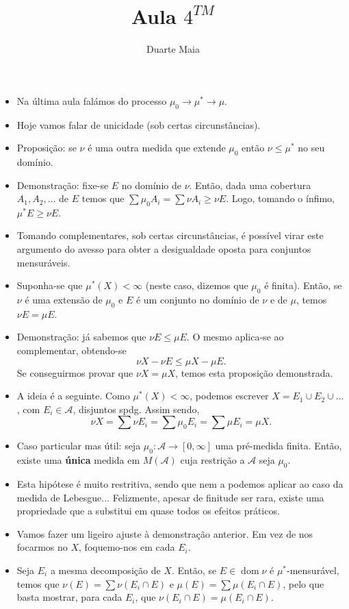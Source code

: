 \documentclass{article}
\title{Aula $4^{TM}$}
\author{Duarte Maia}
\date{}
\DeclareMathOperator{\dom}{dom}
\begin{document}
\maketitle

\begin{itemize}
\item Na última aula falámos do processo $\mu_0 \to \mu^* \to \mu$.
\item Hoje vamos falar de unicidade (sob certas circunstâncias).
\item Proposição: se $\nu$ é uma outra medida que extende $\mu_0$ então $\nu \leq \mu^*$ no seu domínio.
\item Demonstração: fixe-se $E$ no domínio de $\nu$. Então, dada uma cobertura $A_1, A_2, \dots$ de $E$ temos que $\sum \mu_0 A_i = \sum \nu A_i \geq \nu E$. Logo, tomando o ínfimo, $\mu^* E \geq \nu E$.
\item Tomando complementares, sob certas circunstâncias, é possível virar este argumento do avesso para obter a desigualdade oposta para conjuntos mensuráveis.
\item Suponha-se que $\mu^*(X) < \infty$ (neste caso, dizemos que $\mu_0$ é finita). Então, se $\nu$ é uma extensão de $\mu_0$ e $E$ é um conjunto no domínio de $\nu$ e de $\mu$, temos $\nu E = \mu E$.
\item Demonstração: já sabemos que $\nu E \leq \mu E$. O mesmo aplica-se ao complementar, obtendo-se
\[\nu X - \nu E \leq \mu X - \mu E.\]
Se conseguirmos provar que $\nu X = \mu X$, temos esta proposição demonstrada.
\item A ideia é a seguinte. Como $\mu^*(X) < \infty$, podemos escrever $X = E_1 \cup E_2 \cup \dots$, com $E_i \in \mathcal{A}$, disjuntos spdg. Assim sendo,
\[\nu X = \sum \nu E_i = \sum \mu_0 E_i = \sum \mu E_i = \mu X.\]
\item Caso particular mas útil: seja $\mu_0 : \mathcal{A} \to [0,\infty]$ uma pré-medida finita. Então, existe uma \textbf{única} medida em $M(\mathcal A)$ cuja restrição a $\mathcal A$ seja $\mu_0$.
\item Esta hipótese é muito restritiva, sendo que nem a podemos aplicar ao caso da medida de Lebesgue... Felizmente, apesar de finitude ser rara, existe uma propriedade que a substitui em quase todos os efeitos práticos.
\item Vamos fazer um ligeiro ajuste à demonstração anterior. Em vez de nos focarmos no $X$, foquemo-nos em cada $E_i$.
\item Seja $E_i$ a mesma decomposição de $X$. Então, se $E \in \dom \nu$ é $\mu^*$-mensurável, temos que $\nu(E) = \sum \nu(E_i \cap E)$ e $\mu(E) = \sum \mu(E_i \cap E)$, pelo que basta mostrar, para cada $E_i$, que $\nu(E_i \cap E) = \mu(E_i \cap E)$.

\end{itemize}
\end{document}
